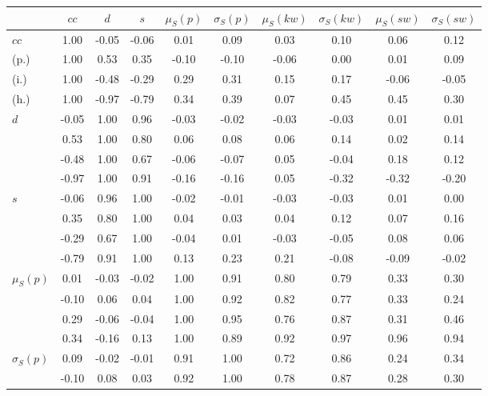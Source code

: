 \begin{table*}[h!]
\begin{center}
\begin{tabular}{| l | c | c | c | c | c | c | c | c | c |}\hline
 & $cc$ & $d$ & $s$ & $\mu_S(p)$ & $\sigma_S(p)$ & $\mu_S(kw)$ & $\sigma_S(kw)$ & $\mu_S(sw)$ & $\sigma_S(sw)$ \\\hline
$cc$ & 1.00  & -0.05  & -0.06  & 0.01  & 0.09  & 0.03  & 0.10  & 0.06  & 0.12 \\\hline
(p.) & 1.00  & 0.53  & 0.35  & -0.10  & -0.10  & -0.06  & 0.00  & 0.01  & 0.09 \\\hline
(i.) & 1.00  & -0.48  & -0.29  & 0.29  & 0.31  & 0.15  & 0.17  & -0.06  & -0.05 \\\hline
(h.) & 1.00  & -0.97  & -0.79  & 0.34  & 0.39  & 0.07  & 0.45  & 0.45  & 0.30 \\\hline
$d$ & -0.05  & 1.00  & 0.96  & -0.03  & -0.02  & -0.03  & -0.03  & 0.01  & 0.01 \\\hline
 & 0.53  & 1.00  & 0.80  & 0.06  & 0.08  & 0.06  & 0.14  & 0.02  & 0.14 \\\hline
 & -0.48  & 1.00  & 0.67  & -0.06  & -0.07  & 0.05  & -0.04  & 0.18  & 0.12 \\\hline
 & -0.97  & 1.00  & 0.91  & -0.16  & -0.16  & 0.05  & -0.32  & -0.32  & -0.20 \\\hline
$s$ & -0.06  & 0.96  & 1.00  & -0.02  & -0.01  & -0.03  & -0.03  & 0.01  & 0.00 \\\hline
 & 0.35  & 0.80  & 1.00  & 0.04  & 0.03  & 0.04  & 0.12  & 0.07  & 0.16 \\\hline
 & -0.29  & 0.67  & 1.00  & -0.04  & 0.01  & -0.03  & -0.05  & 0.08  & 0.06 \\\hline
 & -0.79  & 0.91  & 1.00  & 0.13  & 0.23  & 0.21  & -0.08  & -0.09  & -0.02 \\\hline
$\mu_S(p)$ & 0.01  & -0.03  & -0.02  & 1.00  & 0.91  & 0.80  & 0.79  & 0.33  & 0.30 \\\hline
 & -0.10  & 0.06  & 0.04  & 1.00  & 0.92  & 0.82  & 0.77  & 0.33  & 0.24 \\\hline
 & 0.29  & -0.06  & -0.04  & 1.00  & 0.95  & 0.76  & 0.87  & 0.31  & 0.46 \\\hline
 & 0.34  & -0.16  & 0.13  & 1.00  & 0.89  & 0.92  & 0.97  & 0.96  & 0.94 \\\hline
$\sigma_S(p)$ & 0.09  & -0.02  & -0.01  & 0.91  & 1.00  & 0.72  & 0.86  & 0.24  & 0.34 \\\hline
 & -0.10  & 0.08  & 0.03  & 0.92  & 1.00  & 0.78  & 0.87  & 0.28  & 0.30 \\\hline

\end{tabular}
\end{center}
\end{table*}
